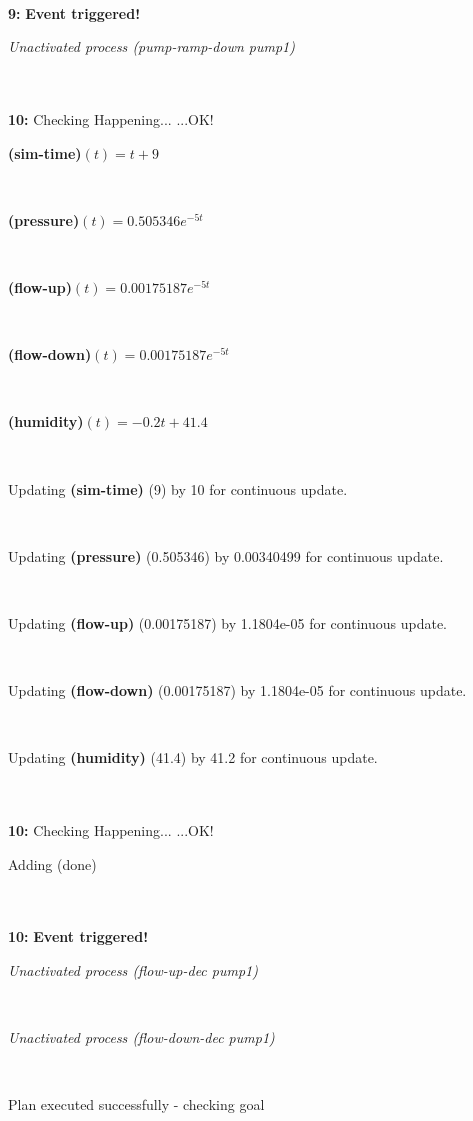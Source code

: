 \documentclass[a4paper,12pt]{article}
\newcommand{\atime}[1]{{\bf #1:}}
\newcommand{\action}[1]{{\sf #1}}
\newcommand{\exprn}[1]{{\sf #1}}
\newcommand{\fexprn}[1]{{\small {\bf #1}}}
\newcommand{\checkhappening}{Checking Happening... }
\newcommand{\eventtriggered}{{\bf Event triggered!}}
\newcommand{\listrow}[1]{\begin{minipage}[t]{11.5cm} #1 \end{minipage}}
\newcommand{\happeningOK}{...OK!}
\newcommand{\aprocessunactivated}[1]{\listrow{{\it Unactivated process #1} }}
\newcommand{\assignmentcts}[3]{\listrow{Updating \fexprn{#1} (#2) by #3 for continuous update.}}
\newcommand{\function}[2]{\listrow{\fexprn{#1}$(t) = #2$}}
\newcommand{\adding}[1]{\listrow{Adding \exprn{#1} }}
\begin{document}
\begin{tabbing}
\\
 \atime{9} \> \eventtriggered \\
\> \aprocessunactivated{\action{(pump-ramp-down pump1)}}\\
\\
\atime{10} \> \checkhappening\happeningOK\\
 \> \function{(sim-time)}{t + 9}\\
 \> \function{(pressure)}{0.505346e^{ - 5t}}\\
 \> \function{(flow-up)}{0.00175187e^{ - 5t}}\\
 \> \function{(flow-down)}{0.00175187e^{ - 5t}}\\
 \> \function{(humidity)}{ - 0.2t + 41.4}\\
 \> \assignmentcts{(sim-time)}{9}{10}\\
 \> \assignmentcts{(pressure)}{0.505346}{0.00340499}\\
 \> \assignmentcts{(flow-up)}{0.00175187}{1.1804e-05}\\
 \> \assignmentcts{(flow-down)}{0.00175187}{1.1804e-05}\\
 \> \assignmentcts{(humidity)}{41.4}{41.2}\\
\\
\atime{10} \> \checkhappening\happeningOK\\
 \> \adding{(done)}\\
\\
 \atime{10} \> \eventtriggered \\
\> \aprocessunactivated{\action{(flow-up-dec pump1)}}\\
\> \aprocessunactivated{\action{(flow-down-dec pump1)}}\\
\end{tabbing}
Plan executed successfully - checking goal\\
\\
\end{document}
